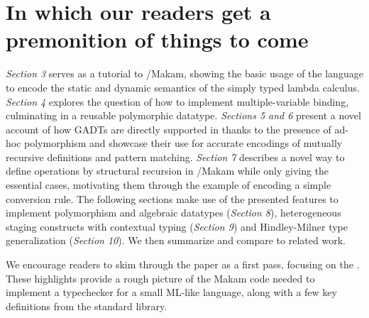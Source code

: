 \section{In which our readers get a premonition of things to
come}\label{in-which-our-readers-get-a-premonition-of-things-to-come}

\identNormal

\emph{Section 3} serves as a tutorial to \lamprolog/Makam, showing the
basic usage of the language to encode the static and dynamic semantics
of the simply typed lambda calculus. \emph{Section 4} explores the
question of how to implement multiple-variable binding, culminating in a
reusable polymorphic datatype. \emph{Sections 5 and 6} present a novel
account of how GADTs are directly supported in \lamprolog thanks to the
presence of ad-hoc polymorphism and showcase their use for accurate
encodings of mutually recursive definitions and pattern matching.
\emph{Section 7} describes a novel way to define operations by
structural recursion in \lamprolog/Makam while only giving the essential
cases, motivating them through the example of encoding a simple
conversion rule. The following sections make use of the presented
features to implement polymorphism and algebraic datatypes
(\emph{Section 8}), heterogeneous staging constructs with contextual
typing (\emph{Section 9}) and Hindley-Milner type generalization
(\emph{Section 10}). We then summarize and compare to related work.

We encourage readers to skim through the paper as a first pass, focusing
on the . These highlights provide a
rough picture of the Makam code needed to implement a typechecker for a
small ML-like language, along with a few key definitions from the
standard library.

\identDialog
